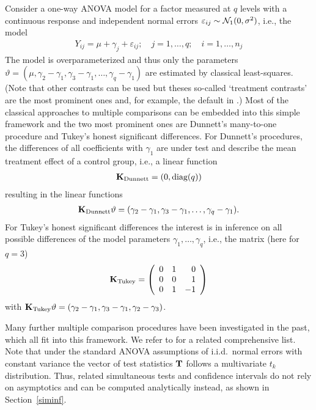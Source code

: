 \documentclass[12pt]{article}
\begin{document}
Consider a one-way ANOVA model for a factor measured at $q$ levels
with a continuous response and independent 
normal errors $\varepsilon_{ij} \sim \mathcal{N}_1(0, \sigma^2)$, 
i.e., the model
\begin{eqnarray*}
Y_{ij} = \mu + \gamma_{j} + \varepsilon_{ij}; \quad j = 1,\dots,q; \quad i = 1, \dots,
n_j
\end{eqnarray*}
The model is overparameterized and thus only the parameters
$\vartheta = (\mu, \gamma_2 - \gamma_1, \gamma_3 - \gamma_1, \dots, \gamma_q -
\gamma_1)$ 
are  estimated by classical least-squares. (Note that other contrasts can be used
but theses so-called `treatment contrasts' are the most prominent ones and,
for example, the default in \RR.) 
Most of the classical approaches
to multiple comparisons can be embedded into this simple framework and 
the two most prominent ones are Dunnett's many-to-one procedure and
Tukey's honest significant differences. For Dunnett's procedures,
the differences of all coefficients with $\gamma_1$ are under test and
describe the mean treatment effect of a control group, i.e.,
a linear function
\begin{eqnarray*}
\mathbf{K}_\text{Dunnett} = (0, \text{diag}(q))
\end{eqnarray*}
resulting in the linear functions
\begin{eqnarray*}
\mathbf{K}_\text{Dunnett} \vartheta = (\gamma_2 - \gamma_1, \gamma_3 - \gamma_1, \dots,
\gamma_q - \gamma_1).
\end{eqnarray*}
For Tukey's honest significant differences the interest is in inference on
all possible differences of the model parameters $\gamma_1, \dots, \gamma_q$, i.e., 
the matrix (here for $q = 3$)
\begin{eqnarray*}
\mathbf{K}_\text{Tukey} = \left( 
\begin{array}{rrr} 0 & 1 & 0 \\
0 & 0 & 1 \\
0 & 1 & -1 
\end{array} \right)
\end{eqnarray*}
with $\mathbf{K}_\text{Tukey} \vartheta = (\gamma_2 - \gamma_1, \gamma_3 - \gamma_1,
\gamma_2 - \gamma_3)$.

Many further multiple comparison procedures have been investigated in the past, 
which all fit into this framework. We refer to \cite{BretzGenzHothorn2001} for a related 
comprehensive list. Note that under the standard ANOVA assumptions of
i.i.d.~normal errors with constant variance the vector of test statistics $\mathbf{T}$ 
follows a multivariate $t_k$ distribution. Thus, related simultaneous tests and 
confidence intervals do not rely on asymptotics and can be computed analytically 
instead, as shown in Section~\ref{siminf}.
\end{document}
